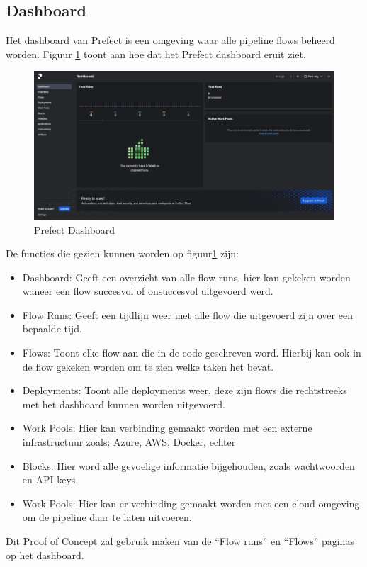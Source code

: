 \subsection{Dashboard}
Het dashboard van Prefect is een omgeving waar alle pipeline flows beheerd worden. Figuur \ref{fig:Prefect_Dashboard} toont aan hoe dat het Prefect dashboard eruit ziet.
\begin{figure}[h]
    \includegraphics[width=\linewidth]{graphics/Prefect_dashboard.PNG}
    \caption{Prefect Dashboard}
    \label{fig:Prefect_Dashboard}
\end{figure}
De functies die gezien kunnen worden op figuur\ref{fig:Prefect_Dashboard} zijn:
\begin{itemize}
    \item Dashboard: Geeft een overzicht van alle flow runs, hier kan gekeken worden waneer een flow succesvol of onsuccesvol uitgevoerd werd.
    \item Flow Runs: Geeft een tijdlijn weer met alle flow die uitgevoerd zijn over een bepaalde tijd.
    \item Flows: Toont elke flow aan die in de code geschreven word. Hierbij kan ook in de flow gekeken worden om te zien welke taken het bevat.
    \item Deployments: Toont alle deployments weer, deze zijn flows die rechtstreeks met het dashboard kunnen worden uitgevoerd.
    \item Work Pools: Hier kan verbinding gemaakt worden met een externe infrastructuur zoals: Azure, AWS, Docker, echter
    \item Blocks: Hier word alle gevoelige informatie bijgehouden, zoals wachtwoorden en API keys.
    \item Work Pools: Hier kan er verbinding gemaakt worden met een cloud omgeving om de pipeline daar te laten uitvoeren.
\end{itemize}
Dit Proof of Concept zal gebruik maken van de ``Flow runs'' en ``Flows'' paginas op het dashboard.

